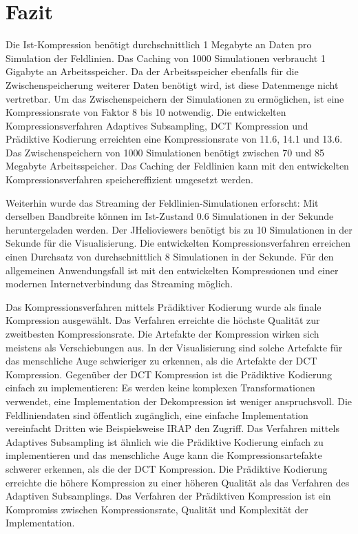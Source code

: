 \section{Fazit}
Die Ist-Kompression benötigt durchschnittlich 1 Megabyte an Daten pro Simulation der Feldlinien. Das Caching von 1000 Simulationen verbraucht 1 Gigabyte an Arbeitsspeicher. Da der Arbeitsspeicher ebenfalls für die Zwischenspeicherung weiterer Daten benötigt wird, ist diese Datenmenge nicht vertretbar. Um das Zwischenspeichern der Simulationen zu ermöglichen, ist eine Kompressionsrate von Faktor 8 bis 10 notwendig. Die entwickelten Kompressionsverfahren Adaptives Subsampling, DCT Kompression und Prädiktive Kodierung erreichten eine Kompressionsrate von 11.6, 14.1 und 13.6. Das Zwischenspeichern von 1000 Simulationen benötigt zwischen 70 und 85 Megabyte Arbeitsspeicher. Das Caching der Feldlinien kann mit den entwickelten Kompressionsverfahren speichereffizient umgesetzt werden.

Weiterhin wurde das Streaming der Feldlinien-Simulationen erforscht: Mit derselben Bandbreite können im Ist-Zustand 0.6 Simulationen in der Sekunde heruntergeladen werden. Der JHelioviewers benötigt bis zu 10 Simulationen in der Sekunde für die Visualisierung. Die entwickelten Kompressionsverfahren erreichen einen Durchsatz von durchschnittlich 8 Simulationen in der Sekunde. Für den allgemeinen Anwendungsfall ist mit den entwickelten Kompressionen und einer modernen Internetverbindung das Streaming möglich.

Das Kompressionsverfahren mittels Prädiktiver Kodierung wurde als finale Kompression ausgewählt. Das Verfahren erreichte die höchste Qualität zur zweitbesten Kompressionsrate. Die Artefakte der Kompression wirken sich meistens als Verschiebungen aus. In der Visualisierung sind solche Artefakte für das menschliche Auge schwieriger zu erkennen, als die Artefakte der DCT Kompression. Gegenüber der DCT Kompression ist die Prädiktive Kodierung einfach zu implementieren: Es werden keine komplexen Transformationen verwendet, eine Implementation der Dekompression ist weniger anspruchsvoll. Die Feldliniendaten sind öffentlich zugänglich, eine einfache Implementation vereinfacht Dritten wie Beispielsweise IRAP \cite{website:irap} den Zugriff. Das Verfahren mittels Adaptives Subsampling ist ähnlich wie die Prädiktive Kodierung einfach zu implementieren und das menschliche Auge kann die Kompressionsartefakte schwerer erkennen, als die der DCT Kompression. Die Prädiktive Kodierung erreichte die höhere Kompression zu einer höheren Qualität als das Verfahren des Adaptiven Subsamplings. Das Verfahren der Prädiktiven Kompression ist ein Kompromiss zwischen Kompressionsrate, Qualität und Komplexität der Implementation.

